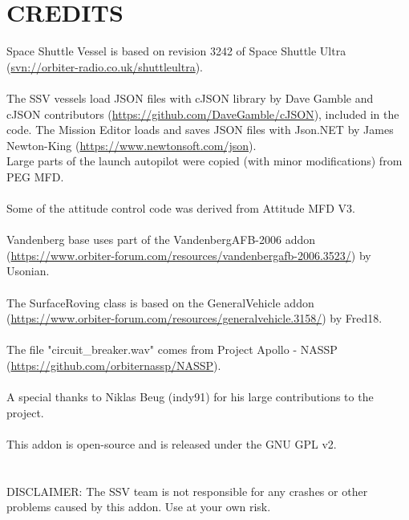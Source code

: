 \documentclass[Space_Shuttle_Vessel_Manual.tex]{subfiles}
\begin{document}
\section{CREDITS}
Space Shuttle Vessel is based on revision 3242 of Space Shuttle Ultra (\url{svn://orbiter-radio.co.uk/shuttleultra}).\\
\\
The SSV vessels load JSON files with cJSON library by Dave Gamble and cJSON contributors (\url{https://github.com/DaveGamble/cJSON}), included in the code. The Mission Editor loads and saves JSON files with Json.NET by James Newton-King (\url{https://www.newtonsoft.com/json}).
\\
Large parts of the launch autopilot were copied (with minor modifications) from PEG MFD.\\
\\
Some of the attitude control code was derived from Attitude MFD V3.\\
\\
Vandenberg base uses part of the VandenbergAFB-2006 addon (\url{https://www.orbiter-forum.com/resources/vandenbergafb-2006.3523/}) by Usonian.\\
\\
The SurfaceRoving class is based on the GeneralVehicle addon (\url{https://www.orbiter-forum.com/resources/generalvehicle.3158/}) by Fred18.\\
\\
The file "circuit\_breaker.wav" comes from Project Apollo - NASSP (\url{https://github.com/orbiternassp/NASSP}).\\
\\
A special thanks to Niklas Beug (indy91) for his large contributions to the project.\\
\\
This addon is open-source and is released under the GNU GPL v2.\\
\\
\\
DISCLAIMER: The SSV team is not responsible for any crashes or other problems caused by this addon. Use at your own risk.
\end{document}

